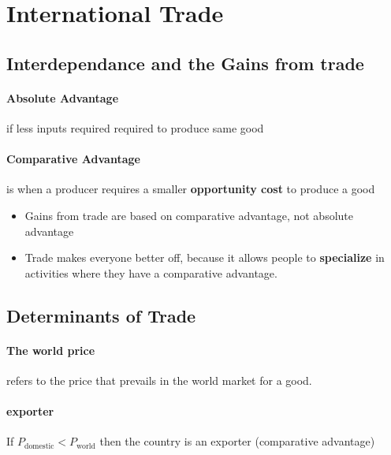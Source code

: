 \documentclass[a4paper,titlepage] {scrartcl}
\begin{document}



\section{International Trade}
\label{sec:international_trade}
\subsection{Interdependance and the Gains from trade} %
\label{sub:interdependance_and_the_gains_from_trade}

\paragraph{Absolute Advantage} %
\label{par:absolute_advantage}
if less inputs required required to produce same good

\paragraph{Comparative Advantage} %
\label{par:comparative_good}
is when a producer requires a smaller \textbf{opportunity cost} to produce a good

\begin{itemize}
	\item Gains from trade are based on comparative advantage, not absolute advantage
	\item Trade makes everyone better off, because it allows people to \textbf{specialize} in activities where they have a comparative advantage.
\end{itemize}

\subsection{Determinants of Trade} %
\label{sub:determinants_of_trade}
\paragraph{The world price} %
\label{par:the_world_price}

 refers to the price that prevails in the world market for a good.

\paragraph{exporter} %
\label{par:exporter}
If $P_{\text{domestic}}<P_{\text{world}}$ then the country is an exporter (comparative advantage)
\end{document}
